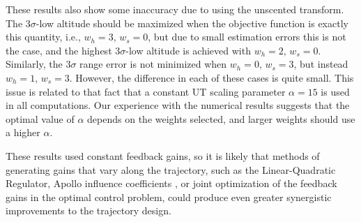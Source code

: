 \documentclass[journal ]{new-aiaa}
\begin{document}
These results also show some inaccuracy due to using the unscented transform. The 3$\sigma$-low altitude should be maximized when the objective function is exactly this quantity, i.e., $w_h=3,\,w_s=0$, but due to small estimation errors this is not the case, and the highest 3$\sigma$-low altitude is achieved with $w_h=2,\,w_s=0$. Similarly, the 3$\sigma$ range error is not minimized when $w_h=0,\,w_s=3$, but instead $w_h=1,\,w_s=3$. However, the difference in each of these cases is quite small. This issue is related to that fact that a constant UT scaling parameter $\alpha=15$ is used in all computations. Our experience with the numerical results suggests that the optimal value of $\alpha$ depends on the weights selected, and larger weights should use a higher $\alpha$. 

These results used constant feedback gains, so it is likely that methods of generating gains that vary along the trajectory, such as the Linear-Quadratic Regulator, Apollo influence coefficients \cite{Apollo}, or joint optimization of the feedback gains in the optimal control problem, could produce even greater synergistic improvements to the trajectory design. 
\end{document}

